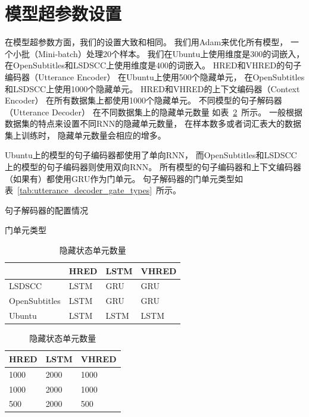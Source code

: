 \section{模型超参数设置}\label{sec:model_hparams}
在模型超参数方面，我们的设置大致和相同。
我们用Adam来优化所有模型，
一个小批（Mini-batch）处理20个样本。
我们在Ubuntu上使用维度是300的词嵌入，
在OpenSubtitles和LSDSCC上使用维度是400的词嵌入。
HRED和VHRED的句子编码器（Utterance Encoder）
在Ubuntu上使用500个隐藏单元，
在OpenSubtitles和LSDSCC上使用1000个隐藏单元。
HRED和VHRED的上下文编码器（Context Encoder）
在所有数据集上都使用1000个隐藏单元。
不同模型的句子解码器（Utterance Decoder）
在不同数据集上的隐藏单元数量
如表~\ref{tab:utterance_decoder_hidden_units}~所示。
一般根据数据集的特点来设置不同RNN的隐藏单元数量，
在样本数多或者词汇表大的数据集上训练时，
隐藏单元数量会相应的增多。

Ubuntu上的模型的句子编码器都使用了单向RNN，
而OpenSubtitles和LSDSCC上的模型的句子编码器则使用双向RNN。
所有模型的句子编码器和上下文编码器（如果有）都使用GRU作为门单元。
句子解码器的门单元类型如表~\ref{tab:utterance_decoder_gate_types}~所示。
\begin{table}
    \centering
    \caption{句子解码器的配置情况}
    \setlength{\tabcolsep}{0.11cm}%
    \begin{subtable}{0.5\linewidth}
        \centering
        \caption{门单元类型}
        \label{tab:utterance_decoder_gate_types}
        \begin{tabular}{llll}
            \toprule
            \midrule
            & HRED & LSTM & VHRED \\
            \midrule
            LSDSCC & LSTM & GRU & GRU \\
            OpenSubtitles & LSTM & GRU & GRU \\
            Ubuntu & LSTM & LSTM & LSTM \\
            \bottomrule
        \end{tabular}
    \end{subtable}%
    \begin{subtable}{0.4\linewidth}
        \centering
        \caption{隐藏状态单元数量}
        \label{tab:utterance_decoder_hidden_units}
        \begin{tabular}{lll}
            \toprule
            \midrule
            HRED & LSTM & VHRED \\
            \midrule
            1000 & 2000 & 1000 \\
            1000 & 2000 & 1000 \\
            500 & 2000 & 500 \\
            \bottomrule
        \end{tabular}
    \end{subtable}
\end{table}


